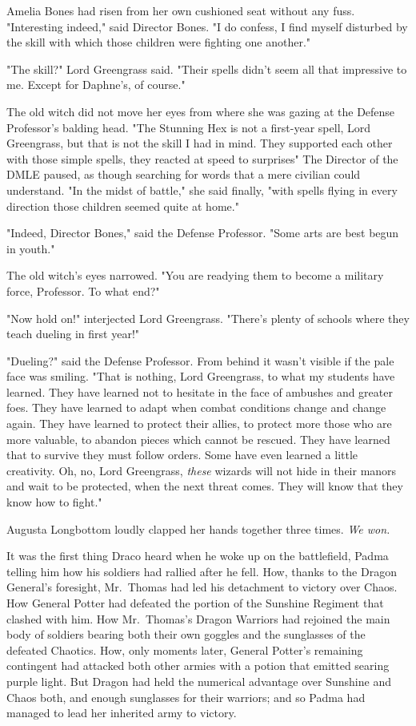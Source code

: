 Amelia Bones had risen from her own cushioned seat without any fuss.
"Interesting indeed," said Director Bones. "I do confess, I find myself
disturbed by the skill with which those children were fighting one another."

"The skill?" Lord Greengrass said. "Their spells didn't seem all that
impressive to me. Except for Daphne's, of course."

The old witch did not move her eyes from where she was gazing at the Defense
Professor's balding head. "The Stunning Hex is not a first-year spell, Lord
Greengrass, but that is not the skill I had in mind. They supported each other
with those simple spells, they reacted at speed to surprises{\el}" The
Director of the DMLE paused, as though searching for words that a mere civilian
could understand. "In the midst of battle," she said finally, "with spells
flying in every direction{\el} those children seemed quite at home."

"Indeed, Director Bones," said the Defense Professor. "Some arts are best begun
in youth."

The old witch's eyes narrowed. "You are readying them to become a military
force, Professor. To what end?"

"Now hold on!" interjected Lord Greengrass. "There's plenty of schools where
they teach dueling in first year!"

"Dueling?" said the Defense Professor. From behind it wasn't visible if the
pale face was smiling. "That is nothing, Lord Greengrass, to what my students
have learned. They have learned not to hesitate in the face of ambushes and
greater foes. They have learned to adapt when combat conditions change and
change again. They have learned to protect their allies, to protect more those
who are more valuable, to abandon pieces which cannot be rescued. They have
learned that to survive they must follow orders. Some have even learned a
little creativity. Oh, no, Lord Greengrass, \emph{these} wizards will not hide
in their manors and wait to be protected, when the next threat comes. They will
know that they know how to fight."

Augusta Longbottom loudly clapped her hands together three times.
\sbreak
\emph{We won.}

It was the first thing Draco heard when he woke up on the battlefield, Padma
telling him how his soldiers had rallied after he fell. How, thanks to the
Dragon General's foresight, Mr.~Thomas had led his detachment to victory over
Chaos. How General Potter had defeated the portion of the Sunshine Regiment
that clashed with him. How Mr.~Thomas's Dragon Warriors had rejoined the main
body of soldiers bearing both their own goggles and the sunglasses of the
defeated Chaotics. How, only moments later, General Potter's remaining
contingent had attacked both other armies with a potion that emitted searing
purple light. But Dragon had held the numerical advantage over Sunshine and
Chaos both, and enough sunglasses for their warriors; and so Padma had managed
to lead her inherited army to victory.

